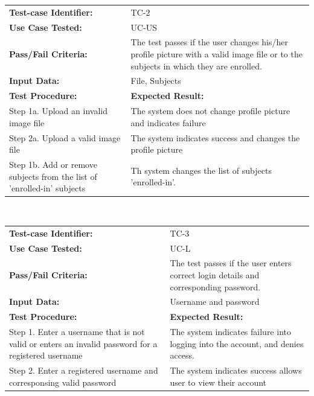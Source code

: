 \documentclass[12pt]{article}
\begin{document}
\begin{tabular}{| p{8cm} | p{8cm} |} \hline
	\textbf{Test-case Identifier:}& TC-2\\
	\textbf{Use Case Tested:}& UC-US\\
	\textbf{Pass/Fail Criteria:}& The test passes if the user changes his/her profile picture with a valid image file or to the subjects in which they are enrolled.\\
	\textbf{Input Data:}& File, Subjects\\\hline
	\textbf{Test Procedure:}& \textbf{Expected Result:} \\\hline
	Step 1a. Upload an invalid image file & The system does not change profile picture and indicates failure\\
	Step 2a. Upload a valid image file & The system indicates success and changes the profile picture\\
		Step 1b. Add or remove subjects from the list of 'enrolled-in' subjects & Th system changes the list of subjects 'enrolled-in'.  \\\hline
\end{tabular}
\\

\begin{tabular}{| p{8cm} | p{8cm} |} \hline
	\textbf{Test-case Identifier:}& TC-3\\
	\textbf{Use Case Tested:}& UC-L\\
	\textbf{Pass/Fail Criteria:}& The test passes if the user enters correct login details and corresponding password.\\
	\textbf{Input Data:}& Username and password\\\hline
	\textbf{Test Procedure:}& \textbf{Expected Result:} \\\hline
	Step 1. Enter a username that is not valid or enters an invalid password for a registered username & The system indicates failure into logging into the account, and denies access. \\
	Step 2. Enter a registered username and corresponsing valid password  & The system indicates success allows user to view their account\\
		\hline
\end{tabular}
\\
\end{document}

